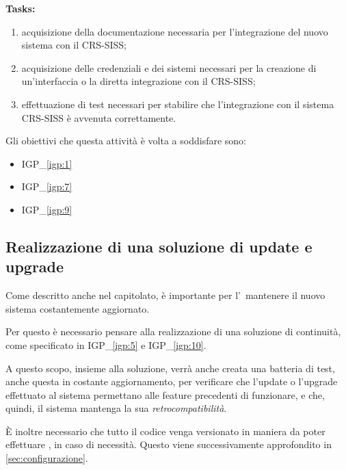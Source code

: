 		\textbf{Tasks:}
		\begin{enumerate}[noitemsep]
			\item acquisizione della documentazione necessaria per l'integrazione del nuovo sistema con il CRS-SISS;
			\item acquisizione delle credenziali e dei sistemi necessari per la creazione di un'interfaccia o la diretta integrazione con il CRS-SISS;
			\item effettuazione di test necessari per stabilire che l'integrazione con il sistema CRS-SISS è avvenuta correttamente.
		\end{enumerate}
	
		Gli obiettivi che questa attività è volta a soddisfare sono:
		\begin{itemize}[noitemsep]
			\renewcommand\labelitemi{--}
			\item {\color{pantone}IGP\_\ref{igp:1}}
			\item {\color{pantone}IGP\_\ref{igp:7}}
			\item {\color{pantone}IGP\_\ref{igp:9}}
		\end{itemize}	

	\subsection{Realizzazione di una soluzione di update e upgrade}
		
		Come descritto anche nel capitolato, è importante per l'\istituto~mantenere il nuovo sistema costantemente aggiornato.
		
		Per questo è necessario pensare alla realizzazione di una soluzione di continuità, come specificato in {\color{pantone}IGP\_\ref{igp:5}} e {\color{pantone}IGP\_\ref{igp:10}}.
		
		A questo scopo, insieme alla soluzione, verrà anche creata una batteria di test, anche questa in costante aggiornamento, per verificare che l'update o l'upgrade effettuato al sistema permettano alle feature precedenti di funzionare, e che, quindi, il sistema mantenga la sua \textit{retrocompatibilità}.
		
		È inoltre necessario che tutto il codice venga versionato in maniera da poter effettuare \rollback, in caso di necessità.
		Questo viene successivamente approfondito in \ref{sec:configurazione}.
		
